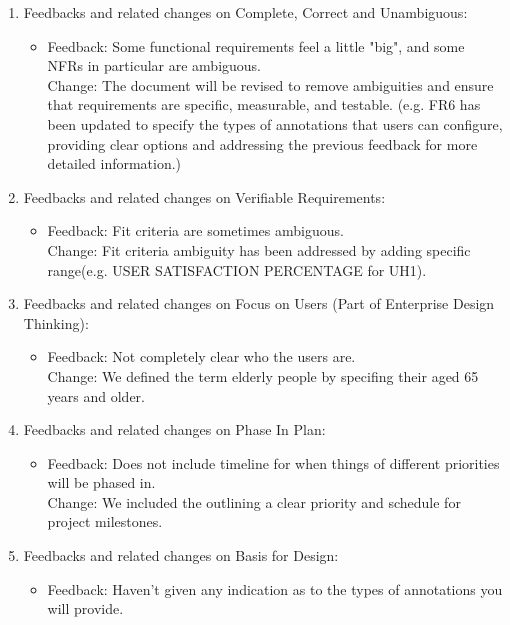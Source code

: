 \documentclass{article}
\begin{document}
\begin{enumerate}
    \item Feedbacks and related changes on Complete, Correct and Unambiguous:
    \begin{itemize}
        \item Feedback: Some functional requirements feel a little "big", and some NFRs in particular are ambiguous.\\
                Change: The document will be revised to remove ambiguities and ensure that requirements are specific, measurable, and testable.
                (e.g. FR6 has been updated to specify the types of annotations that users can configure, providing clear options and addressing the previous feedback for more detailed information.)
    \end{itemize}
    \item Feedbacks and related changes on Verifiable Requirements:
    \begin{itemize}
        \item Feedback: Fit criteria are sometimes ambiguous.\\
                Change: Fit criteria ambiguity has been addressed by adding specific range(e.g. USER SATISFACTION PERCENTAGE for UH1).
    \end{itemize}
    \item Feedbacks and related changes on Focus on Users (Part of Enterprise Design Thinking):
    \begin{itemize}
        \item Feedback: Not completely clear who the users are.\\
                Change: We defined the term elderly people by specifing their aged 65 years and older. 
    \end{itemize}
    \item Feedbacks and related changes on Phase In Plan:
    \begin{itemize}
        \item Feedback: Does not include timeline for when things of different priorities will be phased in.\\
                Change: We included the outlining a clear priority and schedule for project milestones.
    \end{itemize}
    \item Feedbacks and related changes on Basis for Design:
    \begin{itemize}
        \item Feedback: Haven't given any indication as to the types of annotations you will provide.\\

\end{itemize}
\end{enumerate}
\end{document}
